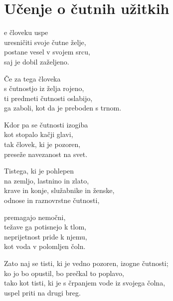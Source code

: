 \cleartorecto
{}
\chapter{Učenje o čutnih užitkih}

e človeku uspe\\
uresničiti svoje čutne želje,\\
postane vesel v svojem srcu,\\
saj je dobil zaželjeno.

Če za tega človeka\\
s čutnostjo iz želja rojeno,\\
ti predmeti čutnosti oslabijo,\\
ga zaboli, kot da je preboden s trnom.

\clearpage

Kdor pa se čutnosti izogiba\\
kot stopalo kačji glavi,\\
tak človek, ki je pozoren,\\
preseže navezanost na svet.

Tistega, ki je pohlepen\\
na zemljo, lastnino in zlato,\\
krave in konje, služabnike in ženske,\\
odnose in raznovrstne čutnosti,

premagajo nemočni,\\
težave ga potisnejo k tlom,\\
neprijetnost pride k njemu,\\
kot voda v polomljen čoln.

Zato naj se tisti, ki je vedno pozoren, izogne čutnosti;\\
ko jo bo opustil, bo prečkal to poplavo,\\
tako kot tisti, ki je s črpanjem vode iz svojega čolna,\\
uspel priti na drugi breg.

